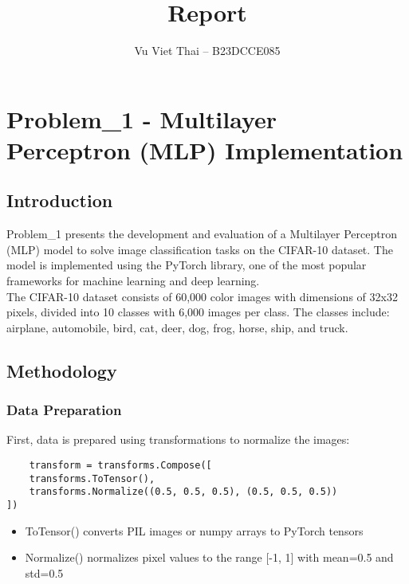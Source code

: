 \documentclass[12pt]{article}
\title{Report}
\author{Vu Viet Thai – B23DCCE085}
\date{}
\begin{document}
\maketitle
\pagestyle{plain}

\section{Problem\_1 - Multilayer Perceptron (MLP) Implementation}

\subsection{Introduction}

Problem\_1 presents the development and evaluation of a Multilayer Perceptron 
(MLP) model to solve image classification tasks on the CIFAR-10 dataset. 
The model is implemented using the PyTorch library, one of the most popular 
frameworks for machine learning and deep learning.\\

The CIFAR-10 dataset consists of 60,000 color images with dimensions of 32x32 
pixels, divided into 10 classes with 6,000 images per class. The classes 
include: airplane, automobile, bird, cat, deer, dog, frog, horse, ship, and 
truck.

\subsection{Methodology}

\subsubsection{Data Preparation}

First, data is prepared using transformations to normalize the images:

\begin{verbatim}
    transform = transforms.Compose([
    transforms.ToTensor(),
    transforms.Normalize((0.5, 0.5, 0.5), (0.5, 0.5, 0.5))
])
\end{verbatim}

\begin{itemize}
    \item ToTensor() converts PIL images or numpy arrays to PyTorch tensors
    \item Normalize() normalizes pixel values to the range [-1, 1] with mean=0.5 
    and std=0.5
\end{itemize}
\end{document}
